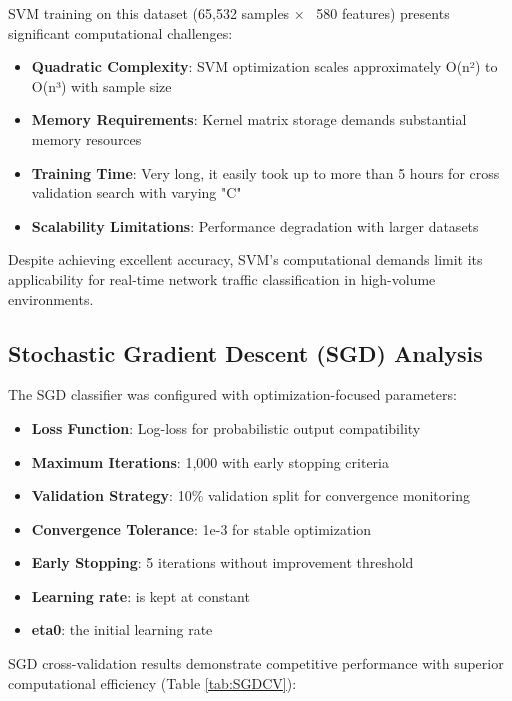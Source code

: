 \documentclass[12pt,a4paper]{article}
\begin{document}
SVM training on this dataset (65,532 samples × ~580 features) presents significant computational challenges:

\begin{itemize}
    \item \textbf{Quadratic Complexity}: SVM optimization scales approximately O(n²) to O(n³) with sample size
    \item \textbf{Memory Requirements}: Kernel matrix storage demands substantial memory resources
    \item \textbf{Training Time}: Very long, it easily took up to more than 5 hours for cross validation search with varying "C"
    \item \textbf{Scalability Limitations}: Performance degradation with larger datasets
\end{itemize}

Despite achieving excellent accuracy, SVM's computational demands limit its applicability for real-time network traffic classification in high-volume environments.

\subsection{Stochastic Gradient Descent (SGD) Analysis}

The SGD classifier was configured with optimization-focused parameters:

\begin{itemize}
    \item \textbf{Loss Function}: Log-loss for probabilistic output compatibility
    \item \textbf{Maximum Iterations}: 1,000 with early stopping criteria
    \item \textbf{Validation Strategy}: 10\% validation split for convergence monitoring
    \item \textbf{Convergence Tolerance}: 1e-3 for stable optimization
    \item \textbf{Early Stopping}: 5 iterations without improvement threshold
    \item \textbf{Learning rate}: is kept at constant
    \item \textbf{eta0}: the initial learning rate
\end{itemize}

SGD cross-validation results demonstrate competitive performance with superior computational efficiency (Table \ref{tab:SGDCV}):
\end{document}
